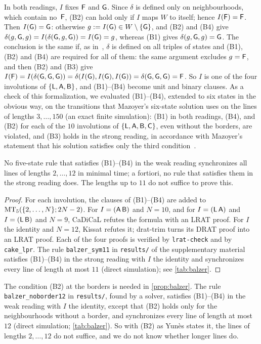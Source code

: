 In both readings, $I$ fixes $\mathsf F$ and $\mathsf G$. Since $\delta$ is defined only on
neighbourhoods, which contain no~$\mathsf F$, (B2) can hold only if $I$ maps $W$ to
itself; hence $I(\mathsf F)=\mathsf F$. Then $I(\mathsf G)=\mathsf G$: otherwise
$g:=I(\mathsf G)\in W\setminus\{\mathsf G\}$, and (B2) and (B4) give
$\delta(g,\mathsf G,g)=I(\delta(\mathsf G,g,\mathsf G))=I(\mathsf G)=g$, whereas (B1) gives
$\delta(g,\mathsf G,g)=\mathsf G$. The conclusion is the same if, as in~\cite{Yunes93},
$\delta$ is defined on all triples of states and (B1), (B2) and (B4) are
required for all of them: the same argument excludes $g=\mathsf F$, and then (B2) and
(B3) give
$I(\mathsf F)=I(\delta(\mathsf G,\mathsf G,\mathsf G))=\delta(I(\mathsf G),I(\mathsf G),I(\mathsf G))=\delta(\mathsf G,\mathsf G,\mathsf G)=\mathsf F$.
So $I$ is one of the four involutions of $\{\mathsf L,\mathsf A,\mathsf B\}$, and (B1)--(B4)
become unit and binary clauses. As a check of this formalization, we evaluated
(B1)--(B4), extended to six states in the obvious way, on the transitions that
Mazoyer's six-state solution uses on the lines of lengths $3,\dots,150$ (an
exact finite simulation): (B1) in both readings, (B4), and (B2) for each of the
$10$ involutions of $\{\mathsf L,\mathsf A,\mathsf B,\mathsf C\}$, even without the borders, are
violated, and (B3) holds in the strong reading, in accordance with Mazoyer's
statement that his solution satisfies only the third
condition~\cite[\S7]{Mazoyer86L}.

\begin{proposition}\label{prop:balzer}
No five-state rule that satisfies (B1)--(B4) in the weak reading synchronizes
all lines of lengths $2,\dots,12$ in minimal time; a fortiori, no rule that
satisfies them in the strong reading does. The lengths up to $11$ do not
suffice to prove this.
\end{proposition}

\begin{proof}
For each involution, the clauses of (B1)--(B4) are added to
$\mathrm{MT}_5(\{2,\dots,N\};2N-2)$. For $I=(\mathsf A\,\mathsf B)$ and $N=10$, and for $I=(\mathsf L\,\mathsf A)$
and $I=(\mathsf L\,\mathsf B)$ and $N=9$, CaDiCaL refutes the formula with an LRAT proof.
For $I$ the identity and $N=12$, Kissat refutes it; \textsf{drat-trim} turns its
DRAT proof into an LRAT proof. Each of the four proofs is verified by
\texttt{lrat-check} and by \texttt{cake\_lpr}. The rule \texttt{balzer\_sym11} in \texttt{results/} of the
supplementary material satisfies
(B1)--(B4) in the strong reading with $I$ the identity and synchronizes every
line of length at most $11$ (direct simulation); see \cref{tab:balzer}.
\end{proof}

The condition (B2) at the borders is needed in \cref{prop:balzer}. The rule
\texttt{balzer\_noborder12} in \texttt{results/}, found by a solver, satisfies (B1)--(B4) in the weak reading with $I$ the
identity, except that (B2) holds only for the neighbourhoods without a border,
and synchronizes every line of length at most $12$ (direct simulation;
\cref{tab:balzer}). So with (B2) as Yun\`es states it,
the lines of lengths $2,\dots,12$ do not suffice, and we do not know whether
longer lines do.

